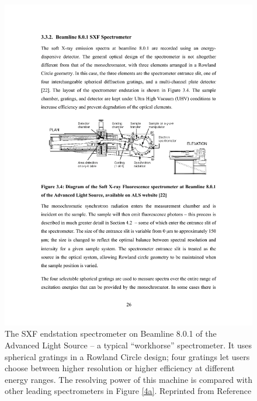 \begin{figure}[htbp] %
   \centering
   \includegraphics[scale=1.2]{../data/Chapter1/1d_spectrometerExample/1d_bl801SXF_2.pdf} 
   \caption[The SXF endstation spectrometer on Beamline 8.0.1 of the Advanced Light Source.]{The SXF endstation spectrometer on Beamline 8.0.1 of the Advanced Light Source -- a typical ``workhorse'' spectrometer.  It uses spherical gratings in a Rowland Circle design; four gratings let users choose between higher resolution or higher efficiency at different energy ranges. The resolving power of this machine is compared with other leading spectrometers in Figure \ref{4a}.  Reprinted from Reference \cite{Jia95}
   }
   \label{1d}
\end{figure}

